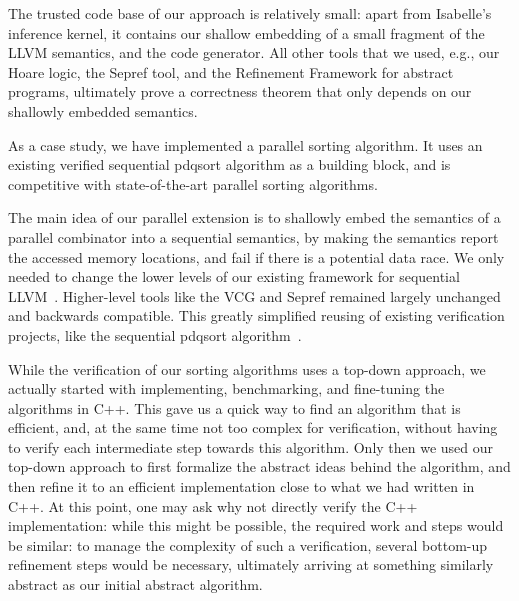 \documentclass[sn-mathphys,Numbered]{sn-jnl}
\theoremstyle{thmstyleone}%
\theoremstyle{definition}%
\theoremstyle{thmstylethree}%
\begin{document}
    The trusted code base of our approach is relatively small:
    apart from Isabelle's inference kernel, it contains our shallow embedding of a small fragment of
    the LLVM semantics, and the code generator.
    All other tools that we used, e.g., our Hoare logic, the Sepref tool, and the Refinement Framework for abstract programs,
    ultimately prove a correctness theorem that only depends on our shallowly embedded semantics.

    As a case study, we have implemented a parallel sorting algorithm.
    It uses an existing verified sequential pdqsort algorithm as a building block,
    and is competitive with state-of-the-art parallel sorting algorithms.

    The main idea of our parallel extension is to shallowly embed the semantics of a
    parallel combinator into a sequential semantics, by making the
    semantics report the accessed memory locations, and fail if there is a potential data race.
    We only needed to change the lower levels of our existing framework for sequential LLVM~\cite{La19-llvm}.
    Higher-level tools like the VCG and Sepref remained largely unchanged and backwards compatible.
    This greatly simplified reusing of existing verification projects, like the sequential pdqsort algorithm~\cite{La20}.

    While the verification of our sorting algorithms uses a top-down approach, we actually started with
    implementing, benchmarking, and fine-tuning the algorithms in C++. This gave us a quick way to
    find an algorithm that is efficient, and, at the same time not too complex for verification,
    without having to verify each intermediate step towards this algorithm.
    Only then we used our top-down approach to first formalize the abstract ideas behind the algorithm,
    and then refine it to an efficient implementation close to what we had written in C++.
    At this point, one may ask why not directly verify the C++ implementation: while this might be
    possible, the required work and steps would be similar: to manage the complexity of such a verification,
    several bottom-up refinement steps would be necessary, ultimately arriving at something similarly abstract
    as our initial abstract algorithm.

%
%
%
%
%
%
%
\end{document}
